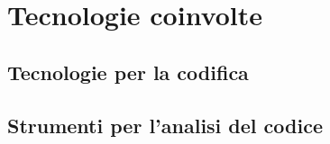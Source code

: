 \section{Tecnologie coinvolte}

\subsection{Tecnologie per la codifica}

\subsection{Strumenti per l’analisi del codice}